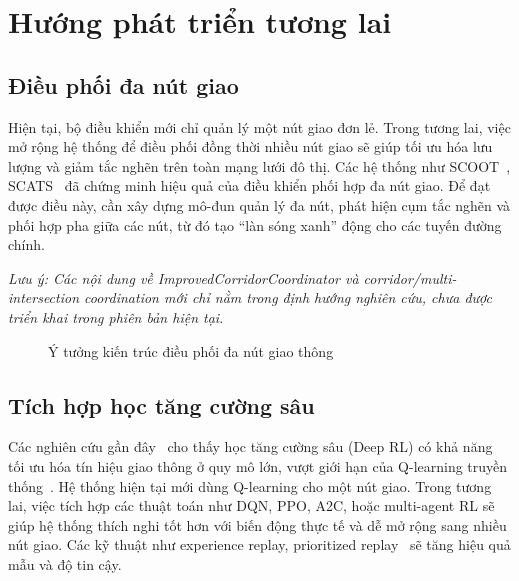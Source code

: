 \chapter{Hướng phát triển tương lai}

\section{Điều phối đa nút giao}

Hiện tại, bộ điều khiển mới chỉ quản lý một nút giao đơn lẻ. Trong tương lai, việc mở rộng hệ thống để điều phối đồng thời nhiều nút giao sẽ giúp tối ưu hóa lưu lượng và giảm tắc nghẽn trên toàn mạng lưới đô thị. Các hệ thống như SCOOT~\cite{Hunt1981}, SCATS~\cite{Lowrie1990} đã chứng minh hiệu quả của điều khiển phối hợp đa nút giao. Để đạt được điều này, cần xây dựng mô-đun quản lý đa nút, phát hiện cụm tắc nghẽn và phối hợp pha giữa các nút, từ đó tạo “làn sóng xanh” động cho các tuyến đường chính.

\vspace{0.3cm}
\noindent\textit{Lưu ý: Các nội dung về ImprovedCorridorCoordinator và corridor/multi-intersection coordination mới chỉ nằm trong định hướng nghiên cứu, chưa được triển khai trong phiên bản hiện tại.}

\begin{figure}[H]
    \centering
    \caption{Ý tưởng kiến trúc điều phối đa nút giao thông}
\end{figure}

\section{Tích hợp học tăng cường sâu}

Các nghiên cứu gần đây~\cite{Wei2019,Li2016,Liang2019,Genders2016,Gao2017,Shingate2020} cho thấy học tăng cường sâu (Deep RL) có khả năng tối ưu hóa tín hiệu giao thông ở quy mô lớn, vượt giới hạn của Q-learning truyền thống~\cite{Watkins1992,Mannion2016}. Hệ thống hiện tại mới dùng Q-learning cho một nút giao. Trong tương lai, việc tích hợp các thuật toán như DQN, PPO, A2C, hoặc multi-agent RL sẽ giúp hệ thống thích nghi tốt hơn với biến động thực tế và dễ mở rộng sang nhiều nút giao. Các kỹ thuật như experience replay, prioritized replay~\cite{Gao2017,Sutton2018} sẽ tăng hiệu quả mẫu và độ tin cậy.

